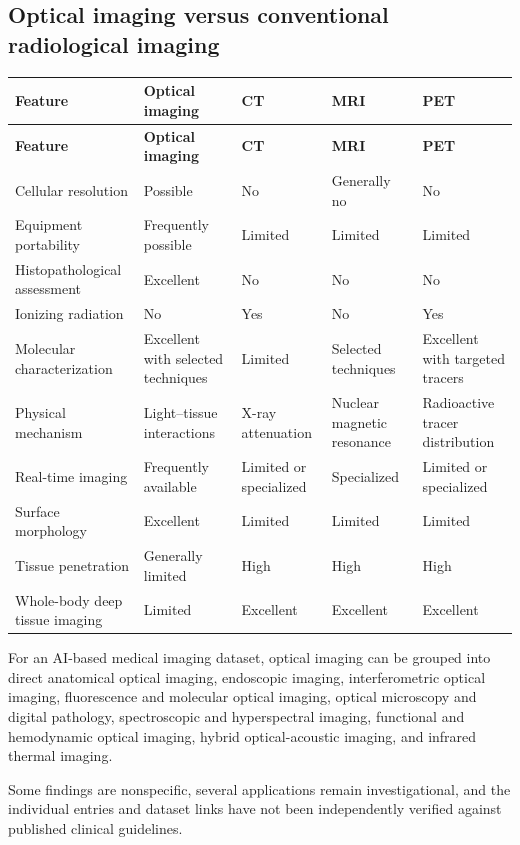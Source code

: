 \subsection{Optical imaging versus conventional radiological imaging}
\begin{longtable}{@{}p{}p{}p{}p{}p{}@{}}
\toprule
\textbf{Feature} & \textbf{Optical imaging} & \textbf{CT} & \textbf{MRI} & \textbf{PET} \\
\midrule
\endfirsthead
\toprule
\textbf{Feature} & \textbf{Optical imaging} & \textbf{CT} & \textbf{MRI} & \textbf{PET} \\
\midrule
\endhead
Cellular resolution & Possible & No & Generally no & No \\
Equipment portability & Frequently possible & Limited & Limited & Limited \\
Histopathological assessment & Excellent & No & No & No \\
Ionizing radiation & No & Yes & No & Yes \\
Molecular characterization & Excellent with selected techniques & Limited & Selected techniques & Excellent with targeted tracers \\
Physical mechanism & Light--tissue interactions & X-ray attenuation & Nuclear magnetic resonance & Radioactive tracer distribution \\
Real-time imaging & Frequently available & Limited or specialized & Specialized & Limited or specialized \\
Surface morphology & Excellent & Limited & Limited & Limited \\
Tissue penetration & Generally limited & High & High & High \\
Whole-body deep tissue imaging & Limited & Excellent & Excellent & Excellent \\
\bottomrule
\end{longtable}

For an AI-based medical imaging dataset, optical imaging can be grouped into direct anatomical optical imaging, endoscopic imaging, interferometric optical imaging, fluorescence and molecular optical imaging, optical microscopy and digital pathology, spectroscopic and hyperspectral imaging, functional and hemodynamic optical imaging, hybrid optical-acoustic imaging, and infrared thermal imaging.

 Some findings are nonspecific, several applications remain investigational, and the individual entries and dataset links have not been independently verified against published clinical guidelines.
